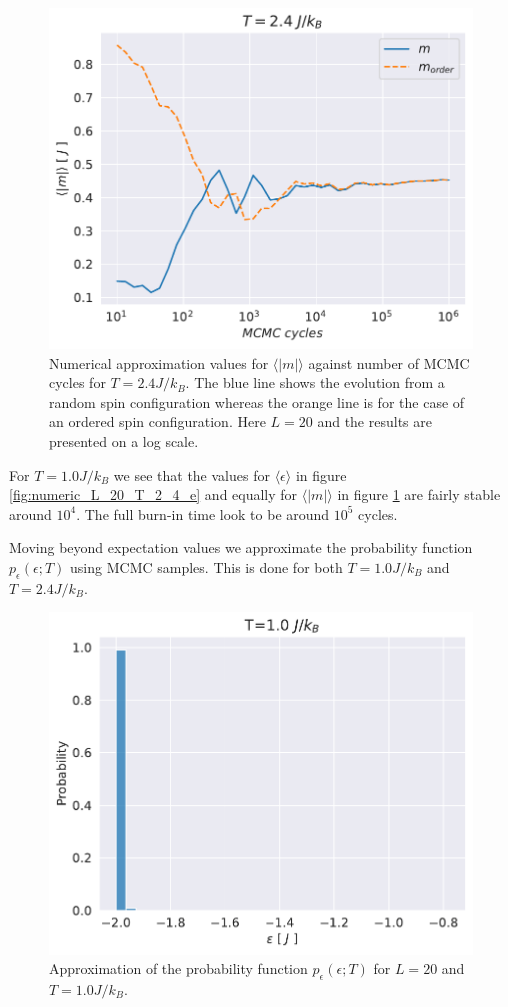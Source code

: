 \documentclass[english,notitlepage,reprint,nofootinbib]{revtex4-1}  %
\begin{document}
\begin{figure}[H]
    \centering
    \includegraphics[width=.5\textwidth]{../figures/numeric_L_20_T_2_4_m.pdf}
    \caption{Numerical approximation values for $\langle |m| \rangle$ against number of MCMC cycles for $T=2.4 J/k_B$. The blue line shows the evolution from a random spin configuration whereas the orange line is for the case of an ordered spin configuration. Here $L=20$ and the results are presented on a log scale.}
    \label{fig:numeric_L_20_T_2_4_m}
\end{figure}
For $T=1.0J/k_B$ we see that the values for $\langle \epsilon \rangle$ in figure \ref{fig:numeric_L_20_T_2_4_e} and equally for $\langle |m| \rangle$ in figure \ref{fig:numeric_L_20_T_2_4_m} are fairly stable around $10^4$. The full burn-in time look to be around $10^5$ cycles.

Moving beyond expectation values we approximate the probability function $p_{\epsilon}(\epsilon ; T)$ using MCMC samples. This is done for both $T=1.0J/k_B$ and $T=2.4J/k_B$.
\begin{figure}[H]
    \centering
    \includegraphics[width=.5\textwidth]{../figures/histogram_T_1_m.pdf}
    \caption{Approximation of the probability function $p_{\epsilon}(\epsilon ; T)$ for $L=20$ and $T=1.0 J/k_B$.}
    \label{fig:histogram_T_1_m}
\end{figure}
\end{document}
